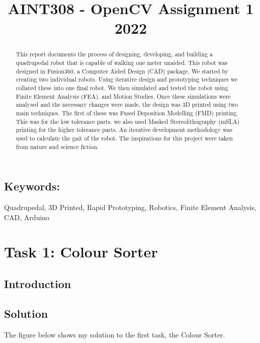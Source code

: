 \documentclass[conference]{IEEEtran}
\newcommand{\forceindent}{\leavevmode{\parindent=1em\indent}}
\begin{document}
\title{AINT308 - OpenCV Assignment 1 2022}

\author{
}

\maketitle

\begin{abstract}
This report documents the process of designing, developing, and building a quadrupedal robot that is capable of walking one meter unaided. This robot was designed in Fusion360, a Computer Aided Design (CAD) package. We started by creating two individual robots. Using iterative design and prototyping techniques we collated these into one final robot. We then simulated and tested the robot using Finite Element Analysis (FEA), and Motion Studies. Once these simulations were analysed and the necessary changes were made, the design was 3D printed using two main techniques. The first of these was Fused Deposition Modelling (FMD) printing. This was for the low tolerance parts. we also used Masked Stereolithography (mSLA) printing for the higher tolerance parts. An iterative development methodology was used to calculate the gait of the robot. The inspirations for this project were taken from nature and science fiction.  
\end{abstract}

\subsection*{Keywords:} 
Quadrupedal, 3D Printed, Rapid Prototyping, Robotics, Finite Element Analysis, CAD, Arduino

\section{Task 1: Colour Sorter}	
\subsection{Introduction}

\subsection{Solution}
\forceindent The figure below shows my solution to the first task, the Colour Sorter. 
\end{document}
